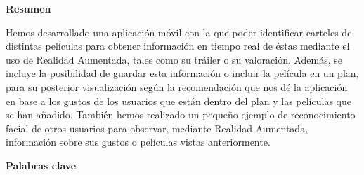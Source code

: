 
\newpage

\thispagestyle{empty}

\begin{center}

{\bf \Huge Resumen}

  \end{center}
\vspace{1cm}

Hemos desarrollado una aplicación móvil con la que poder identificar
carteles de distintas películas para obtener información en tiempo real de
éstas mediante el uso de Realidad Aumentada, tales como su tráiler o su valoración. Además,
se incluye la posibilidad de guardar esta información o incluir la película en un plan, para 
su posterior visualización según la recomendación que nos dé la aplicación en base a 
los gustos de los usuarios que están dentro del plan y las películas que se han añadido. 
También hemos realizado un pequeño ejemplo de reconocimiento facial de otros usuarios para observar, 
mediante Realidad Aumentada, información sobre sus gustos o películas vistas anteriormente.

\vspace{1cm}


\begin{center}

{\bf \Large Palabras clave}

   \end{center}

   \vspace{0.5cm}
   
